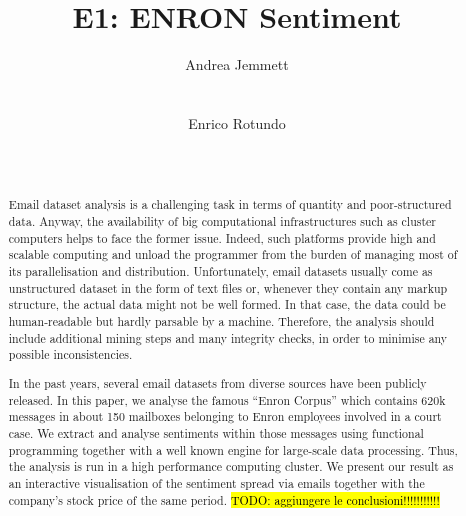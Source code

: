 \documentclass{vldb}
\newcommand{\hlc}[2][lightcyan]{{\sethlcolor{#1}\hl{#2}}}
\begin{document}
\title{E1: ENRON Sentiment}


\author{
\alignauthor
Andrea Jemmett\\
       \\
       \\
\alignauthor
Enrico Rotundo\\
       \\
       \\
}


\maketitle

\begin{abstract}
Email dataset analysis is a challenging task in terms of quantity and poor-structured data.
Anyway, the availability of big computational infrastructures such as cluster computers helps to face the former issue.
Indeed, such platforms provide high and scalable computing and unload the programmer from the burden of managing most of its parallelisation and distribution.
Unfortunately, email datasets usually come as unstructured dataset in the form of text files or, whenever they contain any markup structure, the actual data might not be well formed.
In that case, the data could be human-readable but hardly parsable by a machine.
Therefore, the analysis should include additional mining steps and many integrity checks, in order to minimise any possible inconsistencies.  

In the past years, several email datasets from diverse sources have been publicly released.
In this paper, we analyse the famous ``Enron Corpus'' which contains 620k messages in about 150 mailboxes belonging to Enron employees involved in a court case.
We extract and analyse sentiments within those messages using functional programming together with a well known engine for large-scale data processing. 
Thus, the analysis is run in a high performance computing cluster.   
We present our result as an interactive visualisation of the sentiment spread via emails together with the company's stock price of the same period.
\hlc{TODO: aggiungere le conclusioni!!!!!!!!!!!}

\end{abstract}
\end{document}
